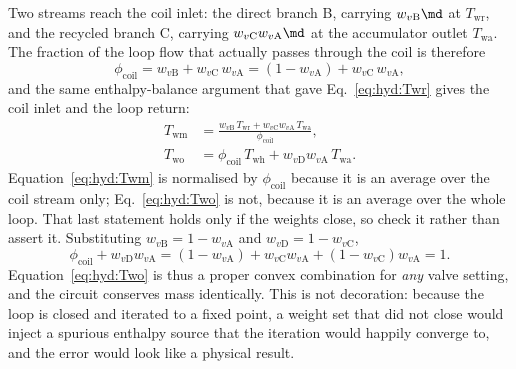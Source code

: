 Two streams reach the coil inlet: the direct branch B, carrying $w_{v\mathrm{B}}\md$ at
$T_{\mathrm{wr}}$, and the recycled branch C, carrying $w_{v\mathrm{C}}w_{v\mathrm{A}}\md$ at
the accumulator outlet $T_{\mathrm{wa}}$. The fraction of the loop flow that actually passes
through the coil is therefore
\begin{equation}
\phi_{\mathrm{coil}}
=w_{v\mathrm{B}}+w_{v\mathrm{C}}\,w_{v\mathrm{A}}
=\left(1-w_{v\mathrm{A}}\right)+w_{v\mathrm{C}}\,w_{v\mathrm{A}} ,
\label{eq:hyd:fraccoil}
\end{equation}
and the same enthalpy-balance argument that gave Eq.~\eqref{eq:hyd:Twr} gives the coil inlet
and the loop return:
\begin{align}
T_{\mathrm{wm}}&=\frac{w_{v\mathrm{B}}\,T_{\mathrm{wr}}
+w_{v\mathrm{C}}w_{v\mathrm{A}}\,T_{\mathrm{wa}}}{\phi_{\mathrm{coil}}},
\label{eq:hyd:Twm}\\[2pt]
T_{\mathrm{wo}}&=\phi_{\mathrm{coil}}\,T_{\mathrm{wh}}
+w_{v\mathrm{D}}w_{v\mathrm{A}}\,T_{\mathrm{wa}} .
\label{eq:hyd:Two}
\end{align}
Equation~\eqref{eq:hyd:Twm} is normalised by $\phi_{\mathrm{coil}}$ because it is an average
over the coil stream only; Eq.~\eqref{eq:hyd:Two} is not, because it is an average over the
whole loop. That last statement holds only if the weights close, so check it rather than assert
it. Substituting $w_{v\mathrm{B}}=1-w_{v\mathrm{A}}$ and $w_{v\mathrm{D}}=1-w_{v\mathrm{C}}$,
\begin{equation}
\phi_{\mathrm{coil}}+w_{v\mathrm{D}}w_{v\mathrm{A}}
=\left(1-w_{v\mathrm{A}}\right)+w_{v\mathrm{C}}w_{v\mathrm{A}}
+\left(1-w_{v\mathrm{C}}\right)w_{v\mathrm{A}}
=1 .
\label{eq:hyd:massclose}
\end{equation}
Equation~\eqref{eq:hyd:Two} is thus a proper convex combination for \emph{any} valve setting,
and the circuit conserves mass identically. This is not decoration: because the loop is closed
and iterated to a fixed point, a weight set that did not close would inject a spurious enthalpy
source that the iteration would happily converge to, and the error would look like a physical
result.

